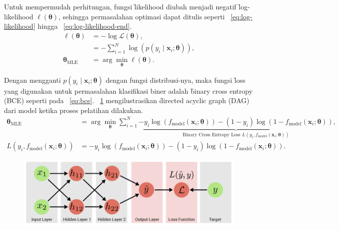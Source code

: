     Untuk mempermudah perhitungan, fungsi \f{likelihood} diubah menjadi negatif \f{log-likelihood} $\mathcal{\ell}(\bm{\theta})$, sehingga permasalahan optimasi dapat ditulis seperti \equ~\ref{eq:log-likelihood} hingga \equ~\ref{eq:log-likelihood-end}.
    \begin{align}
        \label{eq:log-likelihood}
        \ell{(\bm{\theta})} &= -\log\mathcal{L}(\bm{\theta}), \\
        &= -\sum_{i=1}^N \log\left(p(y_i \mid \mathbf{x}_i; \bm{\theta})\right), \\
        \label{eq:log-likelihood-end}
        \bm{\theta}_{\text{MLE}} &= \arg\min_{\bm{\theta}} \ell(\bm{\theta}).
    \end{align} 

    Dengan mengganti $p(y_i \mid \mathbf{x}_i; \bm{\theta})$ dengan fungsi distribusi-nya, maka fungsi \f{loss} yang digunakan untuk permasalahan klasifikasi biner adalah \f{binary cross entropy} (BCE) seperti pada \equ~\ref{eq:bce}. \pic~\ref{fig:dl-training-graph-dag} mengilustrasikan \f{directed acyclic graph} (DAG) dari model ketika proses pelatihan dilakukan.
    \begin{align}
        \bm{\theta}_{\text{MLE}} &= \arg\min_{\bm{\theta}}\sum_{i=1}^{N}\underbrace{-y_i \log\left(f_{\text{model}}(\mathbf{x}_i; \bm{\theta})\right) - (1 - y_i) \log\left(1 - f_{\text{model}}(\mathbf{x}_i; \bm{\theta})\right)}_{\text{Binary Cross Entropy Loss } L(y_i, f_{\text{model}}(\mathbf{x}_i; \bm{\theta}))}, \\
        \label{eq:bce} 
        L(y_i, f_{\text{model}}(\mathbf{x}_i; \bm{\theta})) &= -y_i \log\left(f_{\text{model}}(\mathbf{x}_i; \bm{\theta})\right) - (1 - y_i) \log\left(1 - f_{\text{model}}(\mathbf{x}_i; \bm{\theta})\right).
    \end{align}
    \begin{figure}
        \centering
        \includegraphics[width=1\textwidth]{assets/pics/dl-training-graph.png}
        \label{fig:dl-training-graph-dag}
    \end{figure}

